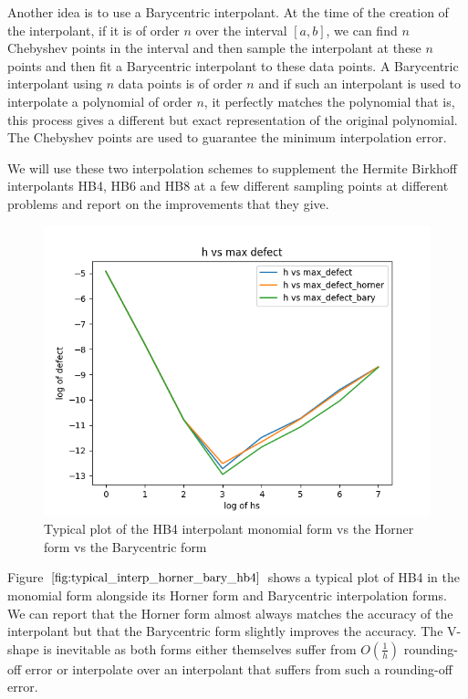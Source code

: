 Another idea is to use a Barycentric interpolant. At the time of the creation of the interpolant, if it is of order $n$ over the interval $[a, b]$, we can find $n$ Chebyshev points in the interval and then sample the interpolant at these $n$ points and then fit a Barycentric interpolant to these data points. A Barycentric interpolant using $n$ data points is of order $n$ and if such an interpolant is used to interpolate a polynomial of order $n$, it perfectly matches the polynomial that is, this process gives a different but exact representation of the original polynomial. The Chebyshev points are used to guarantee the minimum interpolation error.

We will use these two interpolation schemes to supplement the Hermite Birkhoff interpolants HB4, HB6 and HB8 at a few different sampling points at different problems and report on the improvements that they give.

\begin{figure}[H]
\centering
\includegraphics[width=0.7\linewidth]{./figures/typical_interp_horner_bary_hb4}
\caption{Typical plot of the HB4 interpolant monomial form vs the Horner form vs the Barycentric form}
\label{fig:typical_interp_horner_bary_hb4}
\end{figure}

Figure $\ref{fig:typical_interp_horner_bary_hb4}$ shows a typical plot of HB4 in the monomial form alongside its Horner form and Barycentric interpolation forms. We can report that the Horner form almost always matches the accuracy of the interpolant but that the Barycentric form slightly improves the accuracy. The V-shape is inevitable as both forms either themselves suffer from $O(\frac{1}{h})$ rounding-off error or interpolate over an interpolant that suffers from such a rounding-off error.


